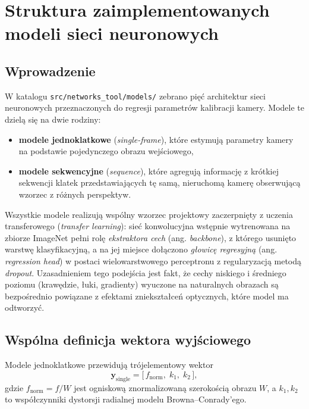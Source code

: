 \documentclass[12pt,a4paper]{report}
\begin{document}
\chapter{Struktura zaimplementowanych modeli sieci neuronowych}
\label{chap:struktura-modeli}

\section{Wprowadzenie}
W katalogu \texttt{src/networks\_tool/models/} zebrano pięć architektur sieci
neuronowych przeznaczonych do regresji parametrów kalibracji kamery. Modele te
dzielą się na dwie rodziny:
\begin{itemize}[leftmargin=*]
  \item \textbf{modele jednoklatkowe} (\emph{single-frame}), które estymują parametry
        kamery na podstawie pojedynczego obrazu wejściowego,
  \item \textbf{modele sekwencyjne} (\emph{sequence}), które agregują informację z krótkiej
        sekwencji klatek przedstawiających tę samą, nieruchomą kamerę obserwującą wzorzec
        z różnych perspektyw.
\end{itemize}

Wszystkie modele realizują wspólny wzorzec projektowy zaczerpnięty z uczenia
transferowego (\emph{transfer learning}): sieć konwolucyjna wstępnie wytrenowana na zbiorze
ImageNet pełni rolę \emph{ekstraktora cech} (ang. \emph{backbone}), z którego usunięto
warstwę klasyfikacyjną, a na jej miejsce dołączono \emph{głowicę regresyjną}
(ang. \emph{regression head}) w postaci wielowarstwowego perceptronu z regularyzacją
metodą \emph{dropout}. Uzasadnieniem tego podejścia jest fakt, że cechy niskiego i
średniego poziomu (krawędzie, łuki, gradienty) wyuczone na naturalnych obrazach są
bezpośrednio powiązane z efektami zniekształceń optycznych, które model ma odtworzyć.

\section{Wspólna definicja wektora wyjściowego}
Modele jednoklatkowe przewidują trójelementowy wektor
\begin{equation}
  \mathbf{y}_{\text{single}} = \big[\, f_{\text{norm}},\; k_1,\; k_2 \,\big],
\end{equation}
gdzie $f_{\text{norm}} = f / W$ jest ogniskową znormalizowaną szerokością obrazu $W$,
a $k_1, k_2$ to współczynniki dystorsji radialnej modelu Browna--Conrady'ego.
\end{document}
